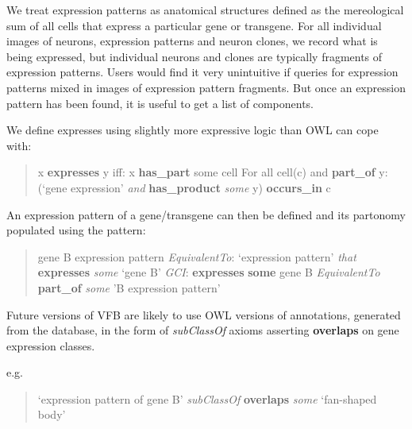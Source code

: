 \documentclass[runningheads,a4paper]{llncs}
\begin{document}


We treat expression patterns as anatomical structures defined as the
mereological sum of all cells that express a particular gene or
transgene. For all individual images of neurons, expression patterns
and neuron clones, we record what is being expressed, but individual
neurons and clones are typically fragments of expression patterns.
Users would find it very unintuitive if queries for expression
patterns mixed in images of expression pattern fragments.   But once
an expression pattern has been found, it is useful to get a list of
components.  


We define expresses using slightly more expressive logic than OWL can cope with:
\begin{quote} 
x \textbf{expresses} y iff: 
x \textbf{has\_part} some cell
For all cell(c) and \textbf{part\_of} y: (`gene expression' \textit{and} \textbf{has\_product} \textit{some} y) \textbf{occurs\_in} c
\end{quote}

An expression pattern of a gene/transgene can then be defined and its
partonomy populated using the pattern:

\begin{quote} 
gene B expression pattern
\textit{EquivalentTo}: `expression pattern' \textit{that}
\textbf{expresses} \textit{some} `gene B'
\textit{GCI}: \textbf{expresses} \textbf{some} gene B \textit{EquivalentTo} \textbf{part\_of} \textit{some} 'B expression pattern'
\end{quote}

 
Future versions of VFB are likely to use OWL versions of annotations, generated from the database, in the form of \textit{subClassOf} axioms asserting \textbf{overlaps} on gene expression classes.

e.g. 
\begin{quote} 
`expression pattern of gene B' \textit{subClassOf} \textbf{overlaps} \textit{some} `fan-shaped body'
\end{quote}



\end{document}
